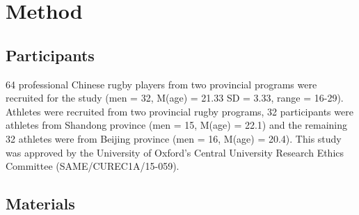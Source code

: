 



\clearpage
\section{Method}

\subsection{Participants}
64 professional Chinese rugby players from two provincial programs were recruited for the study (men = 32, M(age) = 21.33 SD = 3.33, range = 16-29).  Athletes were recruited from two provincial rugby programs, 32
participants were athletes from Shandong province (men = 15, M(age) = 22.1) and the remaining 32 athletes were from Beijing province (men = 16, M(age) = 20.4).  This study was approved by the University of Oxford’s Central University Research Ethics Committee (SAME/CUREC1A/15-059).


\subsection{Materials}


